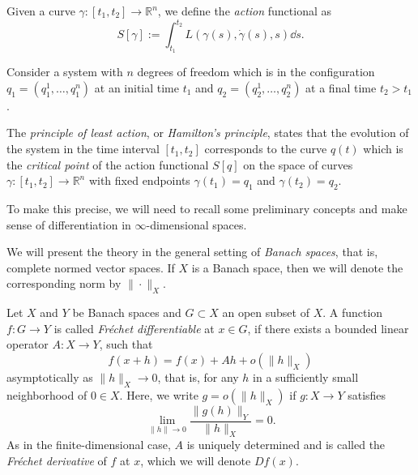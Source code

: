 \documentclass[english,fontsize=11pt,paper=b5]{scrbook}
\numberwithin{equation}{chapter}
\theoremstyle{definition}
\newcommand{\emphidx}[1]{\index{#1}\emph{#1}}
\begin{document}
  Given a curve $\gamma:[t_1, t_2] \to \mathbb{R}^n$, we define the \emphidx{action} functional as
  \begin{equation}\label{eq:Laction}
    S[\gamma] := \int_{t_1}^{t_2} L(\gamma(s), \dot \gamma(s), s) \dd s.
  \end{equation}

  \begin{tcolorbox}[title=Principle of least action]
    Consider a system with $n$ degrees of freedom which is in the configuration $q_1 = (q_1^1, \ldots, q_1^n)$ at an initial time $t_1$ and $q_2 = (q_2^1, \ldots, q_2^n)$ at a final time $t_2 > t_1$.

    The \emph{principle of least action}, or \emph{Hamilton's principle}, states that the evolution of the system in the time interval $[t_1, t_2]$ corresponds to the curve $q(t)$ which is the \emph{critical point} of the action functional $S[q]$ on the space of curves $\gamma:[t_1, t_2] \to \mathbb{R}^n$ with fixed endpoints $\gamma(t_1) = q_1$ and $\gamma(t_2) = q_2$.
  \end{tcolorbox}

  To make this precise, we will need to recall some preliminary concepts and make sense of differentiation in $\infty$-dimensional spaces.\medskip

  We will present the theory in the general setting of \emphidx{Banach spaces}, that is, complete normed vector spaces. If $X$ is a Banach space, then we will denote the corresponding norm by $\|\cdot\|_X$.

  Let $X$ and $Y$ be Banach spaces and $G\subset X$ an open subset of $X$.
  A function $f: G \to Y$ is called \emph{Fr\'echet differentiable}  at $x\in G$, if there exists a bounded linear operator $A: X \to Y$, such that
  \begin{equation}\label{eq:frechetdiff}
    f(x+h) = f(x) + Ah + o(\|h\|_X)
  \end{equation}
  asymptotically as $\|h\|_X\to 0$, that is, for any $h$ in a sufficiently small neighborhood of $0\in X$.
  Here, we write $g = o(\|h\|_X)$ if $g : X \to Y$ satisfies
    \begin{equation}
      \lim_{\|h\| \to 0} \frac{\|g(h)\|_Y}{\|h\|_X} = 0.
    \end{equation}
  As in the finite-dimensional case, $A$ is uniquely determined and is called the \emph{Fr\'echet derivative}  of $f$ at $x$, which we will denote $D f(x)$.
\end{document}

